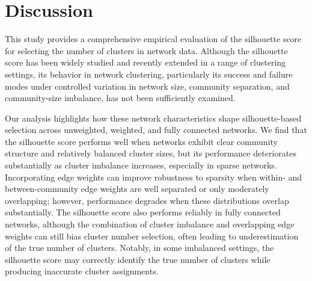 \documentclass[12pt, titlepage, reqno]{article}
\begin{document}
%
%


\section{Discussion}
\label{sec:discuss}


This study provides a comprehensive empirical evaluation of the 
silhouette score for selecting the number of clusters in network 
data. Although the silhouette score has been widely studied and 
recently extended in a range of clustering settings, its behavior in 
network clustering, particularly its success and failure modes under 
controlled variation in network size, community separation, and 
community-size imbalance, has not been sufficiently examined.

Our analysis highlights how these network characteristics shape 
silhouette-based selection across unweighted, weighted, and fully 
connected networks. We find that the silhouette score performs well 
when networks exhibit clear community structure and relatively 
balanced cluster sizes, but its performance deteriorates 
substantially as cluster imbalance increases, especially in sparse 
networks. Incorporating edge weights can improve robustness to 
sparsity when within- and between-community edge weights are well 
separated or only moderately overlapping; however, performance 
degrades when these distributions overlap substantially. The 
silhouette score also performs reliably in fully connected networks, 
although the combination of cluster imbalance and overlapping edge 
weights can still bias cluster number selection, often leading to 
underestimation of the true number of clusters. Notably, in some 
imbalanced settings, the silhouette score may correctly identify the 
true number of clusters while producing inaccurate cluster 
assignments.
\end{document}
